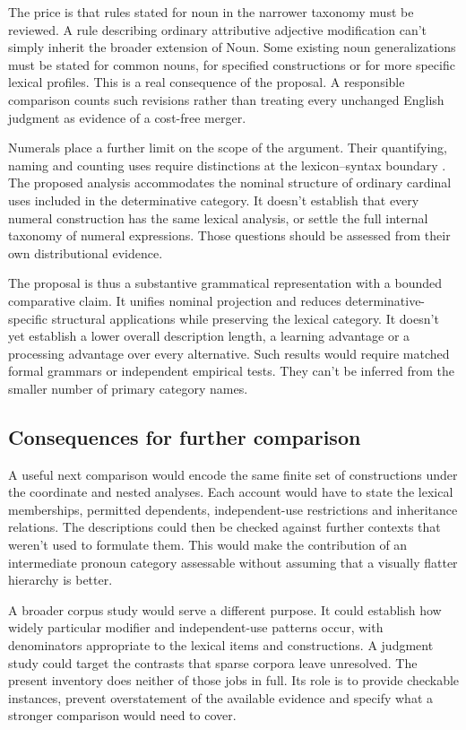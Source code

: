 \documentclass[12pt]{article}
\begin{document}
The price is that rules stated for noun in the narrower taxonomy must be reviewed. A rule describing ordinary attributive adjective modification can't simply inherit the broader extension of Noun. Some existing noun generalizations must be stated for common nouns, for specified constructions or for more specific lexical profiles. This is a real consequence of the proposal. A responsible comparison counts such revisions rather than treating every unchanged English judgment as evidence of a cost-free merger.

Numerals place a further limit on the scope of the argument. Their quantifying, naming and counting uses require distinctions at the lexicon--syntax boundary \citep{reynolds2026numerals}. The proposed analysis accommodates the nominal structure of ordinary cardinal uses included in the determinative category. It doesn't establish that every numeral construction has the same lexical analysis, or settle the full internal taxonomy of numeral expressions. Those questions should be assessed from their own distributional evidence.

The proposal is thus a substantive grammatical representation with a bounded comparative claim. It unifies nominal projection and reduces determinative-specific structural applications while preserving the lexical category. It doesn't yet establish a lower overall description length, a learning advantage or a processing advantage over every alternative. Such results would require matched formal grammars or independent empirical tests. They can't be inferred from the smaller number of primary category names.

\subsection{Consequences for further comparison}

A useful next comparison would encode the same finite set of constructions under the coordinate and nested analyses. Each account would have to state the lexical memberships, permitted dependents, independent-use restrictions and inheritance relations. The descriptions could then be checked against further contexts that weren't used to formulate them. This would make the contribution of an intermediate pronoun category assessable without assuming that a visually flatter hierarchy is better.

A broader corpus study would serve a different purpose. It could establish how widely particular modifier and independent-use patterns occur, with denominators appropriate to the lexical items and constructions. A judgment study could target the contrasts that sparse corpora leave unresolved. The present inventory does neither of those jobs in full. Its role is to provide checkable instances, prevent overstatement of the available evidence and specify what a stronger comparison would need to cover.
\end{document}
